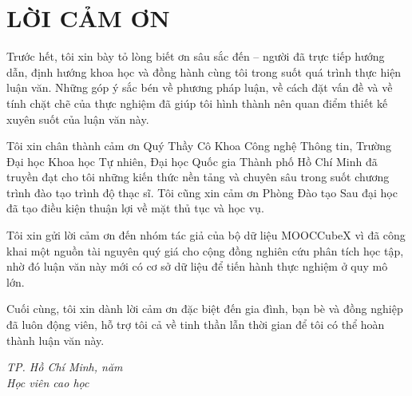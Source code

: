\chapter*{LỜI CẢM ƠN}

\vspace{0.5cm}

Trước hết, tôi xin bày tỏ lòng biết ơn sâu sắc đến \cbhd{} -- người đã trực tiếp hướng dẫn, định hướng khoa học và đồng hành cùng tôi trong suốt quá trình thực hiện luận văn. Những góp ý sắc bén về phương pháp luận, về cách đặt vấn đề và về tính chặt chẽ của thực nghiệm đã giúp tôi hình thành nên quan điểm thiết kế xuyên suốt của luận văn này.

Tôi xin chân thành cảm ơn Quý Thầy Cô Khoa Công nghệ Thông tin, Trường Đại học Khoa học Tự nhiên, Đại học Quốc gia Thành phố Hồ Chí Minh đã truyền đạt cho tôi những kiến thức nền tảng và chuyên sâu trong suốt chương trình đào tạo trình độ thạc sĩ. Tôi cũng xin cảm ơn Phòng Đào tạo Sau đại học đã tạo điều kiện thuận lợi về mặt thủ tục và học vụ.

Tôi xin gửi lời cảm ơn đến nhóm tác giả của bộ dữ liệu MOOCCubeX vì đã công khai một nguồn tài nguyên quý giá cho cộng đồng nghiên cứu phân tích học tập, nhờ đó luận văn này mới có cơ sở dữ liệu để tiến hành thực nghiệm ở quy mô lớn.

Cuối cùng, tôi xin dành lời cảm ơn đặc biệt đến gia đình, bạn bè và đồng nghiệp đã luôn động viên, hỗ trợ tôi cả về tinh thần lẫn thời gian để tôi có thể hoàn thành luận văn này.

\vspace{1cm}

\begin{flushright}
\begin{minipage}{0.5\textwidth}
\centering
\textit{TP. Hồ Chí Minh, năm \nambaove}\\
\textit{Học viên cao học}\\[2cm]
\hvchname
\end{minipage}
\end{flushright}

\clearpage
